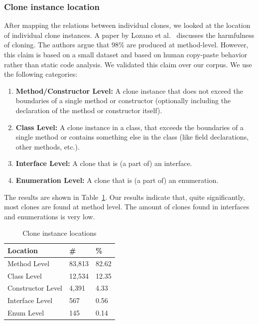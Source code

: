 \documentclass[a4paper]{article}
\begin{document}
\subsubsection{Clone instance location}\label{chap:clonelocation}
After mapping the relations between individual clones, we looked at the location of individual clone instances. A paper by Lozano et al.~\cite{lozano2007evaluating} discusses the harmfulness of cloning. The authors argue that 98\% are produced at method-level. However, this claim is based on a small dataset and based on human copy-paste behavior rather than static code analysis. We validated this claim over our corpus. We use the following categories:
\begin{enumerate}
  \item \textbf{Method/Constructor Level:} A clone instance that does not exceed the boundaries of a single method or constructor (optionally including the declaration of the method or constructor itself).
  \item \textbf{Class Level:} A clone instance in a class, that exceeds the boundaries of a single method or contains something else in the class (like field declarations, other methods, etc.).
  \item \textbf{Interface Level:} A clone that is (a part of) an interface.
  \item \textbf{Enumeration Level:} A clone that is (a part of) an enumeration.
\end{enumerate}

The results are shown in Table~\ref{table:locations}. Our results indicate that, quite significantly, most clones are found at method level. The amount of clones found in interfaces and enumerations is very low.

\begin{table}[H]
  \begin{center}
  \caption{Clone instance locations} \label{table:locations}
  \medskip
\begin{tabular}{|l|l|l|}
\hline
\textbf{Location}   & \textbf{\#} & \textbf{\%} \\ \hline
Method Level        & 83,813 & 82.62            \\ \hline
Class Level        & 12,534 & 12.35            \\ \hline
Constructor Level    & 4,391 & 4.33           \\ \hline
Interface Level   & 567 & 0.56           \\ \hline
Enum Level         & 145 & 0.14            \\ \hline
\end{tabular}
\end{center}
\end{table}
\end{document}
